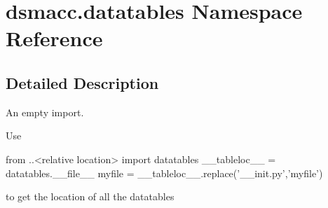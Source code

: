 \hypertarget{namespacedsmacc_1_1datatables}{}\section{dsmacc.\+datatables Namespace Reference}
\label{namespacedsmacc_1_1datatables}


\subsection{Detailed Description}
\begin{DoxyVerb}An empty import.

Use

from ..<relative location> import datatables
__tableloc__ = datatables.__file__
myfile = __tableloc__.replace('__init.py','myfile')

to get the location of all the datatables\end{DoxyVerb}
 